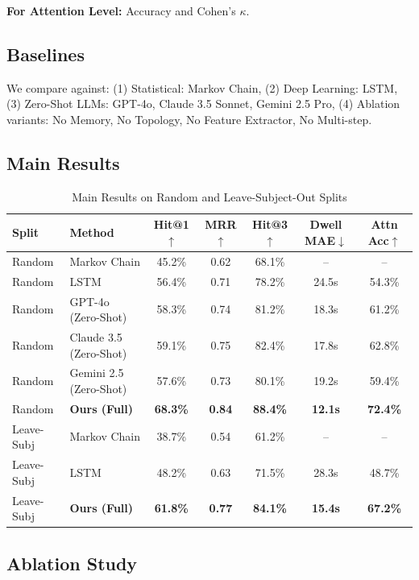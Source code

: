 \documentclass{letterpaper,article}
\begin{document}
\textbf{For Attention Level:} Accuracy and Cohen's $\kappa$.

\subsection{Baselines}

We compare against: (1) Statistical: Markov Chain, (2) Deep Learning: LSTM, (3) Zero-Shot LLMs: GPT-4o, Claude 3.5 Sonnet, Gemini 2.5 Pro, (4) Ablation variants: No Memory, No Topology, No Feature Extractor, No Multi-step.

\subsection{Main Results}

\begin{table}[h]
\centering
\caption{Main Results on Random and Leave-Subject-Out Splits}
\begin{tabular}{llccccc}
\toprule
Split & Method & Hit@1$\uparrow$ & MRR$\uparrow$ & Hit@3$\uparrow$ & Dwell MAE$\downarrow$ & Attn Acc$\uparrow$ \\
\midrule
Random & Markov Chain & 45.2\% & 0.62 & 68.1\% & -- & -- \\
Random & LSTM & 56.4\% & 0.71 & 78.2\% & 24.5s & 54.3\% \\
Random & GPT-4o (Zero-Shot) & 58.3\% & 0.74 & 81.2\% & 18.3s & 61.2\% \\
Random & Claude 3.5 (Zero-Shot) & 59.1\% & 0.75 & 82.4\% & 17.8s & 62.8\% \\
Random & Gemini 2.5 (Zero-Shot) & 57.6\% & 0.73 & 80.1\% & 19.2s & 59.4\% \\
\rowcolor{green!10} Random & \textbf{Ours (Full)} & \textbf{68.3\%} & \textbf{0.84} & \textbf{88.4\%} & \textbf{12.1s} & \textbf{72.4\%} \\
\midrule
Leave-Subj & Markov Chain & 38.7\% & 0.54 & 61.2\% & -- & -- \\
Leave-Subj & LSTM & 48.2\% & 0.63 & 71.5\% & 28.3s & 48.7\% \\
\rowcolor{green!10} Leave-Subj & \textbf{Ours (Full)} & \textbf{61.8\%} & \textbf{0.77} & \textbf{84.1\%} & \textbf{15.4s} & \textbf{67.2\%} \\
\bottomrule
\end{tabular}
\label{tab:main_results}
\end{table}

\subsection{Ablation Study}
\end{document}

